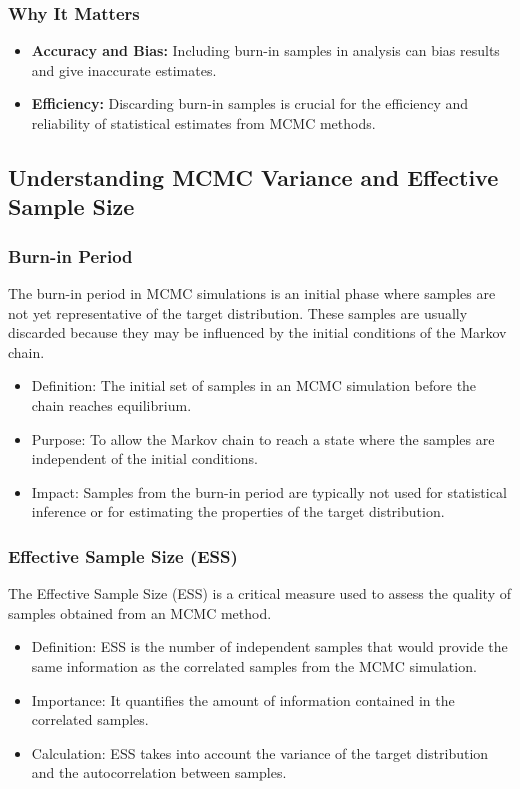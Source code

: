 \documentclass{article}
\begin{document}
\subsubsection{Why It Matters}

\begin{itemize}
    \item \textbf{Accuracy and Bias:} Including burn-in samples in analysis can bias results and give inaccurate estimates.
    \item \textbf{Efficiency:} Discarding burn-in samples is crucial for the efficiency and reliability of statistical estimates from MCMC methods.
\end{itemize}

\subsection{Understanding MCMC Variance and Effective Sample Size}
\subsubsection{Burn-in Period}
The burn-in period in MCMC simulations is an initial phase where samples are not yet representative of the target distribution. These samples are usually discarded because they may be influenced by the initial conditions of the Markov chain.

\begin{itemize}
    \item Definition: The initial set of samples in an MCMC simulation before the chain reaches equilibrium.
    \item Purpose: To allow the Markov chain to reach a state where the samples are independent of the initial conditions.
    \item Impact: Samples from the burn-in period are typically not used for statistical inference or for estimating the properties of the target distribution.
\end{itemize}

\subsubsection{Effective Sample Size (ESS)}
The Effective Sample Size (ESS) is a critical measure used to assess the quality of samples obtained from an MCMC method.

\begin{itemize}
    \item Definition: ESS is the number of independent samples that would provide the same information as the correlated samples from the MCMC simulation.
    \item Importance: It quantifies the amount of information contained in the correlated samples.
    \item Calculation: ESS takes into account the variance of the target distribution and the autocorrelation between samples.
\end{itemize}
\end{document}

